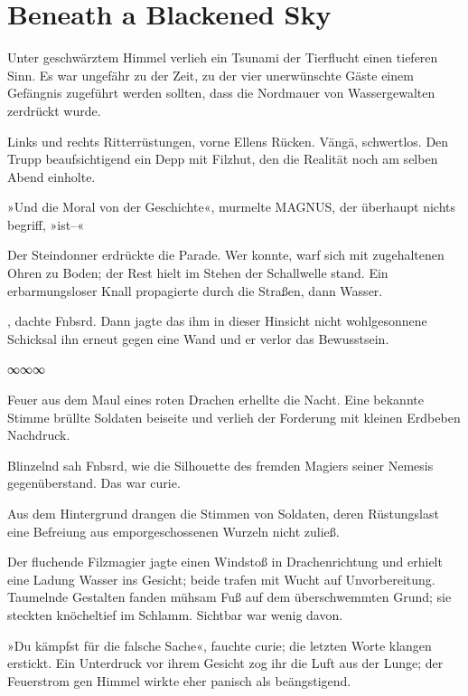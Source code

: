 \chapter{Beneath a Blackened Sky}

Unter geschwärztem Himmel verlieh ein Tsunami der Tierflucht einen tieferen Sinn. Es war ungefähr zu der Zeit, zu der vier unerwünschte Gäste einem Gefängnis zugeführt werden sollten, dass die Nordmauer von Wassergewalten zerdrückt wurde.

Links und rechts Ritterrüstungen, vorne Ellens Rücken. Vängä, schwertlos. Den Trupp beaufsichtigend ein Depp mit Filzhut, den die Realität noch am selben Abend einholte.

»Und die Moral von der Geschichte«, murmelte MAGNUS, der überhaupt nichts begriff, »ist–«

Der Steindonner erdrückte die Parade. Wer konnte, warf sich mit zugehaltenen Ohren zu Boden; der Rest hielt im Stehen der Schallwelle stand. Ein erbarmungsloser Knall propagierte durch die Straßen, dann Wasser.

, dachte Fnbsrd.  Dann jagte das ihm in dieser Hinsicht nicht wohlgesonnene Schicksal ihn erneut gegen eine Wand und er verlor das Bewusstsein.

\begin{center}
∞∞∞
\end{center}

Feuer aus dem Maul eines roten Drachen erhellte die Nacht. Eine bekannte Stimme brüllte Soldaten beiseite und verlieh der Forderung mit kleinen Erdbeben Nachdruck.

Blinzelnd sah Fnbsrd, wie die Silhouette des fremden Magiers seiner Nemesis gegenüberstand. Das war curie.

Aus dem Hintergrund drangen die Stimmen von Soldaten, deren Rüstungslast eine Befreiung aus emporgeschossenen Wurzeln nicht zuließ.

Der fluchende Filzmagier jagte einen Windstoß in Drachenrichtung und erhielt eine Ladung Wasser ins Gesicht; beide trafen mit Wucht auf Unvorbereitung. Taumelnde Gestalten fanden mühsam Fuß auf dem überschwemmten Grund; sie steckten knöcheltief im Schlamm. Sichtbar war wenig davon.

»Du kämpfst für die falsche Sache«, fauchte curie; die letzten Worte klangen erstickt. Ein Unterdruck vor ihrem Gesicht zog ihr die Luft aus der Lunge; der Feuerstrom gen Himmel wirkte eher panisch als beängstigend.

